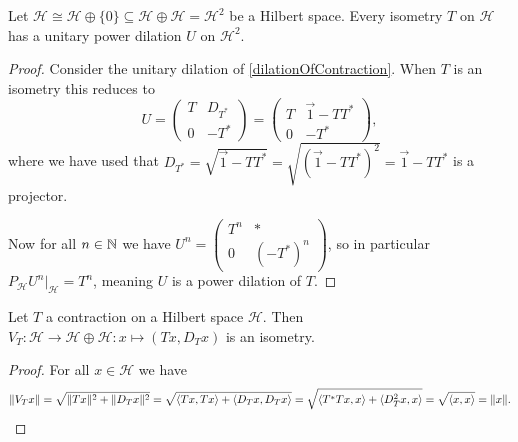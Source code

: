 \begin{proposition}
Let $\mathcal{H} \cong \mathcal{H}\oplus \{0\} \subseteq \mathcal{H}\oplus \mathcal{H} = \mathcal{H}^2$ be a Hilbert space. Every isometry $T$ on $\mathcal{H}$ has a unitary power dilation $U$ on $\mathcal{H}^2$.
\end{proposition}
\begin{proof}
Consider the unitary dilation of \ref{dilationOfContraction}. When $T$ is an isometry this reduces to
\[ U = \begin{pmatrix}
T & D_{T^*} \\ 0 & -T^*
\end{pmatrix} = \begin{pmatrix}
T & \vec{1}-TT^* \\ 0 & -T^*
\end{pmatrix}, \]
where we have used that $D_{T^*} = \sqrt{\vec{1}-TT^*} = \sqrt{(\vec{1}-TT^*)^2} = \vec{1}-TT^*$ is a projector.

Now for all $n\in\mathbb{N}$ we have $U^n = \begin{pmatrix}
T^n & * \\ 0 & (-T^*)^n
\end{pmatrix}$, so in particular $P_\mathcal{H}U^n|_\mathcal{H} = T^n$, meaning $U$ is a power dilation of $T$. 
\end{proof}

\begin{lemma}
Let $T$ a contraction on a Hilbert space $\mathcal{H}$. Then $V_T: \mathcal{H} \to \mathcal{H}\oplus\mathcal{H}: x\mapsto (Tx, D_Tx)$ is an isometry.
\end{lemma}
\begin{proof}
For all $x\in \mathcal{H}$ we have
\[ \norm{V_Tx} = \sqrt{\norm{Tx}^2 + \norm{D_Tx}^2} = \sqrt{\inner{Tx,Tx} + \inner{D_Tx,D_Tx}} = \sqrt{\inner{T^*Tx,x} + \inner{D_T^2x,x}} = \sqrt{\inner{x,x}} = \norm{x}. \]
\end{proof}

